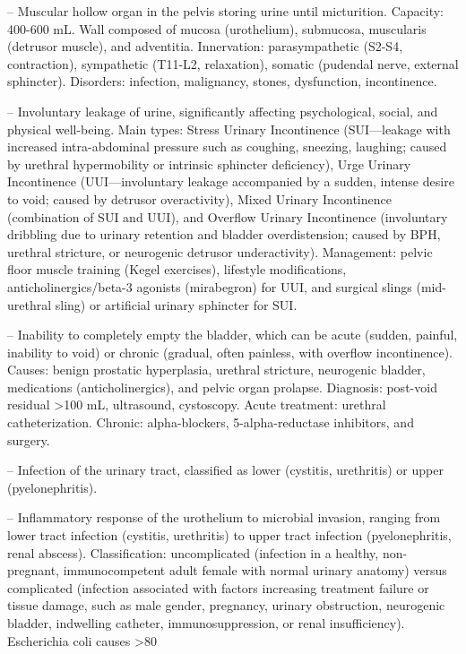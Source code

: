 -- Muscular hollow organ in the pelvis storing urine until micturition. Capacity: 400-600 mL. Wall composed of mucosa (urothelium), submucosa, muscularis (detrusor muscle), and adventitia. Innervation: parasympathetic (S2-S4, contraction), sympathetic (T11-L2, relaxation), somatic (pudendal nerve, external sphincter). Disorders: infection, malignancy, stones, dysfunction, incontinence.

-- Involuntary leakage of urine, significantly affecting psychological, social, and physical well-being. Main types: Stress Urinary Incontinence (SUI—leakage with increased intra-abdominal pressure such as coughing, sneezing, laughing; caused by urethral hypermobility or intrinsic sphincter deficiency), Urge Urinary Incontinence (UUI—involuntary leakage accompanied by a sudden, intense desire to void; caused by detrusor overactivity), Mixed Urinary Incontinence (combination of SUI and UUI), and Overflow Urinary Incontinence (involuntary dribbling due to urinary retention and bladder overdistension; caused by BPH, urethral stricture, or neurogenic detrusor underactivity). Management: pelvic floor muscle training (Kegel exercises), lifestyle modifications, anticholinergics/beta-3 agonists (mirabegron) for UUI, and surgical slings (mid-urethral sling) or artificial urinary sphincter for SUI.

-- Inability to completely empty the bladder, which can be acute (sudden, painful, inability to void) or chronic (gradual, often painless, with overflow incontinence). Causes: benign prostatic hyperplasia, urethral stricture, neurogenic bladder, medications (anticholinergics), and pelvic organ prolapse. Diagnosis: post-void residual >100 mL, ultrasound, cystoscopy. Acute treatment: urethral catheterization. Chronic: alpha-blockers, 5-alpha-reductase inhibitors, and surgery.

-- Infection of the urinary tract, classified as lower (cystitis, urethritis) or upper (pyelonephritis).

-- Inflammatory response of the urothelium to microbial invasion, ranging from lower tract infection (cystitis, urethritis) to upper tract infection (pyelonephritis, renal abscess). Classification: uncomplicated (infection in a healthy, non-pregnant, immunocompetent adult female with normal urinary anatomy) versus complicated (infection associated with factors increasing treatment failure or tissue damage, such as male gender, pregnancy, urinary obstruction, neurogenic bladder, indwelling catheter, immunosuppression, or renal insufficiency). Escherichia coli causes >80%


